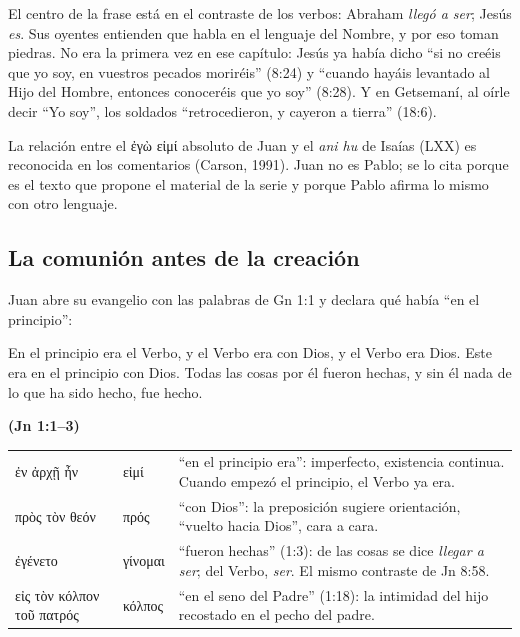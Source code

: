 \documentclass[11pt,letterpaper]{article}
\newcommand{\grc}[1]{\foreignlanguage{ancientgreek}{#1}}
\newcommand{\fuente}[1]{\par\hfill{\upshape\bfseries\small\textcolor{azul}{#1}}}
\begin{document}
El centro de la frase está en el contraste de los verbos: Abraham \emph{llegó a ser}; Jesús \emph{es}. Sus oyentes entienden que habla en el lenguaje del Nombre, y por eso toman piedras. No era la primera vez en ese capítulo: Jesús ya había dicho ``si no creéis que yo soy, en vuestros pecados moriréis'' (8:24) y ``cuando hayáis levantado al Hijo del Hombre, entonces conoceréis que yo soy'' (8:28). Y en Getsemaní, al oírle decir ``Yo soy'', los soldados ``retrocedieron, y cayeron a tierra'' (18:6).

\begin{nota}[Precisión]
La relación entre el \grc{ἐγὼ εἰμί} absoluto de Juan y el \emph{ani hu} de Isaías (LXX) es reconocida en los comentarios (Carson, 1991). Juan no es Pablo; se lo cita porque es el texto que propone el material de la serie y porque Pablo afirma lo mismo con otro lenguaje.
\end{nota}

\subsection{La comunión antes de la creación}
Juan abre su evangelio con las palabras de Gn 1:1 y declara qué había ``en el principio'':

\begin{cita}En el principio era el Verbo, y el Verbo era con Dios, y el Verbo era Dios. Este era en el principio con Dios. Todas las cosas por él fueron hechas, y sin él nada de lo que ha sido hecho, fue hecho.\fuente{(Jn 1:1--3)}\end{cita}

\begin{filologia}[Jn 1:1--3, 18]
\begin{tabular}{@{}L{3.2cm}L{1.6cm}L{10cm}@{}}
\grc{ἐν ἀρχῇ ἦν} & \grc{εἰμί} & ``en el principio era'': imperfecto, existencia continua. Cuando empezó el principio, el Verbo ya era. \\[2pt]
\grc{πρὸς τὸν θεόν} & \grc{πρός} & ``con Dios'': la preposición sugiere orientación, ``vuelto hacia Dios'', cara a cara. \\[2pt]
\grc{ἐγένετο} & \grc{γίνομαι} & ``fueron hechas'' (1:3): de las cosas se dice \emph{llegar a ser}; del Verbo, \emph{ser}. El mismo contraste de Jn 8:58. \\[2pt]
\grc{εἰς τὸν κόλπον τοῦ πατρός} & \grc{κόλπος} & ``en el seno del Padre'' (1:18): la intimidad del hijo recostado en el pecho del padre. \\
\end{tabular}
\end{filologia}
\end{document}
